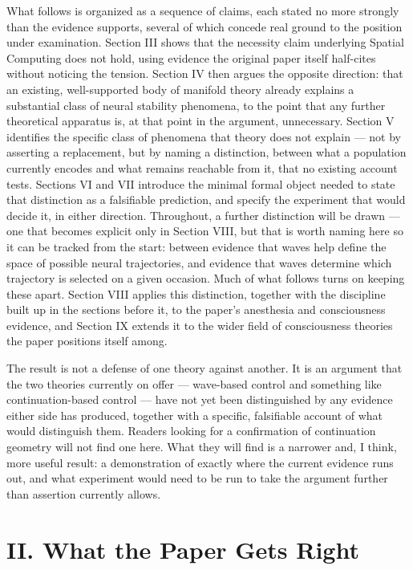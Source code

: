 \documentclass[11pt]{article}
\begin{document}
What follows is organized as a sequence of claims, each stated no more strongly than the evidence supports, several of which concede real ground to the position under examination. Section III shows that the necessity claim underlying Spatial Computing does not hold, using evidence the original paper itself half-cites without noticing the tension. Section IV then argues the opposite direction: that an existing, well-supported body of manifold theory already explains a substantial class of neural stability phenomena, to the point that any further theoretical apparatus is, at that point in the argument, unnecessary. Section V identifies the specific class of phenomena that theory does not explain — not by asserting a replacement, but by naming a distinction, between what a population currently encodes and what remains reachable from it, that no existing account tests. Sections VI and VII introduce the minimal formal object needed to state that distinction as a falsifiable prediction, and specify the experiment that would decide it, in either direction. Throughout, a further distinction will be drawn — one that becomes explicit only in Section VIII, but that is worth naming here so it can be tracked from the start: between evidence that waves help define the space of possible neural trajectories, and evidence that waves determine which trajectory is selected on a given occasion. Much of what follows turns on keeping these apart. Section VIII applies this distinction, together with the discipline built up in the sections before it, to the paper's anesthesia and consciousness evidence, and Section IX extends it to the wider field of consciousness theories the paper positions itself among.

The result is not a defense of one theory against another. It is an argument that the two theories currently on offer — wave-based control and something like continuation-based control — have not yet been distinguished by any evidence either side has produced, together with a specific, falsifiable account of what would distinguish them. Readers looking for a confirmation of continuation geometry will not find one here. What they will find is a narrower and, I think, more useful result: a demonstration of exactly where the current evidence runs out, and what experiment would need to be run to take the argument further than assertion currently allows.
\section*{II. What the Paper Gets Right}
\end{document}
